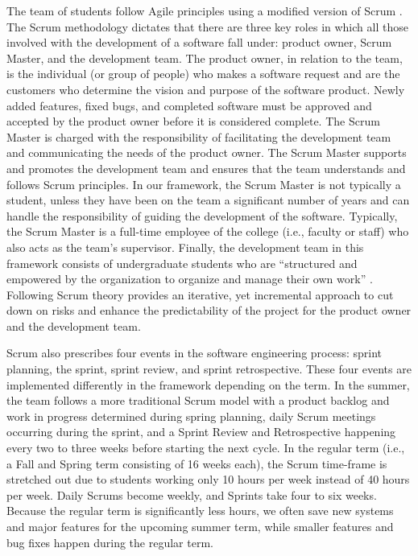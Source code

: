 The team of students follow Agile principles \cite{agilemanifesto} using a modified version of Scrum \cite{thescrumguide}. The Scrum methodology dictates that there are three key roles in which all those involved with the development of a software fall under: product owner, Scrum Master, and the development team. The product owner, in relation to the team, is the individual (or group of people) who makes a software request and are the customers who determine the vision and purpose of the software product. Newly added features, fixed bugs, and completed software must be approved and accepted by the product owner before it is considered complete. The Scrum Master is charged with the responsibility of facilitating the development team and communicating the needs of the product owner. The Scrum Master supports and promotes the development team and ensures that the team understands and follows Scrum principles. In our framework, the Scrum Master is not typically a student, unless they have been on the team a significant number of years and can handle the responsibility of guiding the development of the software. Typically, the Scrum Master is a full-time employee of the college (i.e., faculty or staff) who also acts as the team's supervisor. Finally, the development team in this framework consists of undergraduate students who are ``structured and empowered by the organization to organize and manage their own work'' \cite{thescrumguide}. Following Scrum theory provides an iterative, yet incremental approach to cut down on risks and enhance the predictability of the project for the product owner and the development team.

Scrum also prescribes four events in the software engineering process: sprint planning, the sprint, sprint review, and sprint retrospective. These four events are implemented differently in the framework depending on the term. In the summer, the team follows a more traditional Scrum model with a product backlog and work in progress determined during spring planning, daily Scrum meetings occurring during the sprint, and a Sprint Review and Retrospective happening every two to three weeks before starting the next cycle. In the regular term (i.e., a Fall and Spring term consisting of 16 weeks each), the Scrum time-frame is stretched out due to students working only 10 hours per week instead of 40 hours per week. Daily Scrums become weekly, and Sprints take four to six weeks. Because the regular term is significantly less hours, we often save new systems and major features for the upcoming summer term, while smaller features and bug fixes happen during the regular term.

